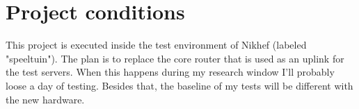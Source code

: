 \section{Project conditions}
This project is executed inside the test environment of Nikhef (labeled "speeltuin"). The plan is to replace the core router that is used as an uplink for the test servers. When this happens during my research window I'll probably loose a day of testing. Besides that, the baseline of my tests will be different with the new hardware.   
